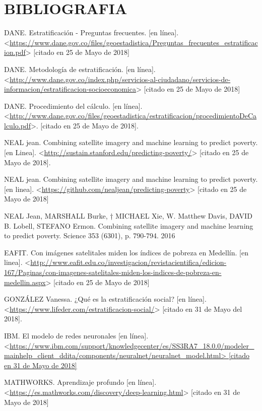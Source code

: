     
    


    
\newpage\chapter*{BIBLIOGRAFIA}

DANE. Estratificación - Preguntas frecuentes. [en línea]. <\url{https://www.dane.gov.co/files/geoestadistica/Preguntas_frecuentes_estratificacion.pdf}> [citado en 25 de Mayo de 2018]
    
DANE. Metodología de estratificación. [en línea].
 <\url{http://www.dane.gov.co/index.php/servicios-al-ciudadano/servicios-de-informacion/estratificacion-socioeconomica}> [citado en 25 de Mayo de 2018]

DANE. Procedimiento del cálculo. [en línea].
 <\url{http://www.dane.gov.co/files/geoestadistica/estratificacion/procedimientoDeCalculo.pdf}>.
 [citado en 25 de Mayo de 2018].
 
NEAL jean. Combining satellite imagery and machine learning to predict poverty. [en Linea]. <\url{http://sustain.stanford.edu/predicting-poverty/}> [citado en 25 de Mayo de 2018].

NEAL jean. Combining satellite imagery and machine learning to predict poverty. [en linea]. <\url{https://github.com/nealjean/predicting-poverty}> [citado en 25 de Mayo de 2018]

NEAL Jean, MARSHALL Burke, † MICHAEL Xie, W. Matthew Davis, DAVID B. Lobell, STEFANO Ermon. Combining satellite imagery and machine learning to predict poverty. Science 353 (6301), p. 790-794. 2016

EAFIT. Con imágenes satelitales miden los índices de pobreza en Medellín. [en linea]. <\url{http://www.eafit.edu.co/investigacion/revistacientifica/edicion-167/Paginas/con-imagenes-satelitales-miden-los-indices-de-pobreza-en-medellin.aspx}> [citado en 25 de Mayo de 2018]

GONZÁLEZ Vanessa. ¿Qué es la estratificación social? [en línea]. <\url{https://www.lifeder.com/estratificacion-social/}> [citado en 31 de Mayo del 2018].

IBM. El modelo de redes neuronales [en línea]. <\url{https://www.ibm.com/support/knowledgecenter/es/SS3RA7_18.0.0/modeler_mainhelp_client_ddita/components/neuralnet/neuralnet_model.html> [citado en 31 de Mayo de 2018]}

MATHWORKS. Aprendizaje profundo [en línea]. <\url{https://es.mathworks.com/discovery/deep-learning.html}> [citado en 31 de Mayo de 2018]

